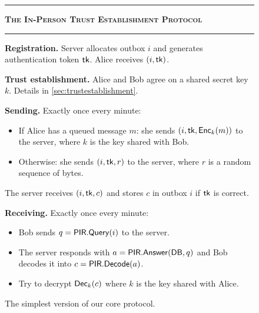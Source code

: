\begin{figure}
  \begin{framed}
  {\raggedright
      \small
  
  \begin{hangparas}{1em}{1}
        \hrule
        \vspace{0.15cm}
        \textsc{\textbf{The In-Person Trust Establishment Protocol}}
        \vspace{0.1cm}
        \hrule
        \vspace{0.1cm}
  \medskip
      
      \textbf{Registration.}
          Server allocates outbox $i$ and generates authentication token $\authtoken$.
          Alice receives $(i, \authtoken)$.
  
  \medskip

      \textbf{Trust establishment.}
          Alice and Bob agree on a shared secret key $k$. Details in \cref{sec:trustestablishment}.

          \medskip

      \textbf{Sending.}
          Exactly once every minute: \begin{itemize}
              \item If Alice has a queued message $m$: she sends $(i, \authtoken, \enc_k(m))$ to the server, where $k$ is the key shared with Bob.
              \item Otherwise: she sends $(i, \authtoken, r)$ to the server, where $r$ is a random sequence of bytes.
          \end{itemize}
          The server receives $(i, \authtoken, c)$ and stores $c$ in outbox $i$ if $\authtoken$ is correct.

  \medskip

      
      \textbf{Receiving.} Exactly once every minute:
    \begin{itemize}
      \item Bob sends $q = \mathsf{PIR.Query}(i)$ to the server.
      \item The server responds with $a = \mathsf{PIR.Answer}(\mathsf{DB}, q)$ and Bob decodes it into $c = \mathsf{PIR.Decode}(a)$.
      \item Try to decrypt $\mathsf{Dec}_k(c)$ where $k$ is the key shared with Alice.
    \end{itemize}
  \end{hangparas}
  }
  \end{framed}
  \caption{The simplest version of our core protocol.}
  \label{fig:trust-establishment-inperson}
\end{figure}



